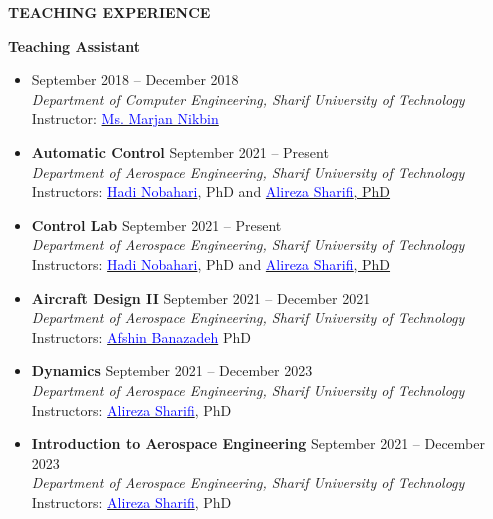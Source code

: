 \documentclass[12pt]{article}
\begin{document}
\begin{center}
	{\noindent \bfseries TEACHING EXPERIENCE}
\end{center}
{\bfseries Teaching Assistant}
\begin{itemize}
	\item {}
	 \hfill September 2018 -- December 2018 \\
	\textit{Department of Computer Engineering, Sharif University of Technology}\\
	\noindent Instructor: \href{https://www.linkedin.com/in/marjan-nikbin-a27451111}{\textcolor{blue}{Ms. Marjan Nikbin}}
	\item {\bfseries Automatic Control}
	 \hfill September 2021 -- Present \\
	\textit{Department of Aerospace Engineering, Sharif University of Technology}\\
	Instructors: \href{https://ae.sharif.edu/~portal/faculty/1091235256}{\textcolor{blue}{Hadi Nobahari}}, PhD and \href{https://ae.sharif.edu/~portal/faculty/1730782165}{\textcolor{blue}{Alireza Sharifi}, PhD}
	\item {\bfseries Control Lab}
	 \hfill September 2021 -- Present \\
	\textit{Department of Aerospace Engineering, Sharif University of Technology}\\
	Instructors: \href{https://ae.sharif.edu/~portal/faculty/1091235256}{\textcolor{blue}{Hadi Nobahari}}, PhD and \href{https://ae.sharif.edu/~portal/faculty/1730782165}{\textcolor{blue}{Alireza Sharifi}, PhD}
	\item {\bfseries Aircraft Design II}
	 \hfill September 2021 -- December 2021 \\
	\textit{Department of Aerospace Engineering, Sharif University of Technology}\\
	Instructors: \href{http://ae.sharif.edu/~portal/faculty/1014037799}{\textcolor{blue}{Afshin Banazadeh}} PhD
	\item {\bfseries Dynamics}
	 \hfill September 2021 -- December 2023 \\
	\textit{Department of Aerospace Engineering, Sharif University of Technology}\\
	Instructors: \href{https://ae.sharif.edu/~portal/faculty/1730782165}{\textcolor{blue}{Alireza Sharifi}}, PhD
	\item {\bfseries Introduction to Aerospace Engineering}
	 \hfill September 2021 -- December 2023 \\
	\textit{Department of Aerospace Engineering, Sharif University of Technology}\\
	Instructors: \href{https://ae.sharif.edu/~portal/faculty/1730782165}{\textcolor{blue}{Alireza Sharifi}}, PhD


\end{itemize}
\end{document}
